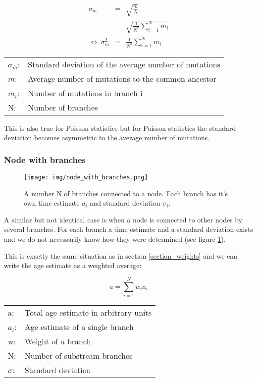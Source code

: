 \begin{eqnarray}
\sigma_{\bar{m}} & = & \sqrt{\frac{\bar{m}}{N}}\\
                 & = & \sqrt{\frac{1}{N^2} \sum_{i=1}^{N}m_i}\\
\Leftrightarrow\ \sigma_{\bar{m}}^2 & = & \frac{1}{N^2} \sum_{i=1}^{N}m_i
\end{eqnarray}

\begin{tabular}{ll}
$\sigma_{\bar{m}}$: &  Standard deviation of the average number of mutations\\
$\bar{m}$: & Average number of mutations to the common ancestor\\
$m_i$: &  Number of mutations in branch i\\
N: &  Number of branches
\end{tabular}
\vspace{1em}

This is also true for Poisson statistics but for Poisson
statistics the standard deviation becomes asymmetric to
the average number of mutations.


\subsubsection*{Node with branches}

\begin{figure}[ht]
\centering
\texttt{[image: img/node\_with\_branches.png]}
\caption{\label{node_with_branches} A number N of branches
connected to a node. Each branch has it's own time estimate
$a_i$ and standard deviation $\sigma_i$.}
\end{figure}

A similar but not identical case is when a node is connected
to other nodes by several branches. For each branch a time
estimate and a standard deviation exists and we do not necessarily
know how they were determined (see figure \ref{node_with_branches}).

This is exactly the same situation as in section \ref{section_weights}
and we can write the age estimate as a weighted average:

\begin{equation}
a = \sum_{i = 1}^{N} w_i a_i
\end{equation}

\begin{tabular}{ll}
a: &  Total age estimate in arbitrary units\\
$a_i$: &  Age estimate of a single branch\\
w: &  Weight of a branch\\
N: &  Number of substream branches\\
$\sigma$: & Standard deviation
\end{tabular}
\vspace{1em}

